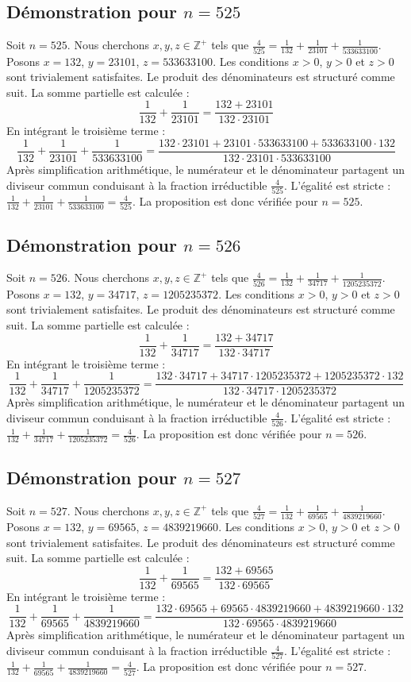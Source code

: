 \documentclass[11pt,a4paper]{article}
\begin{document}
\subsection{Démonstration pour $n = 525$}
Soit $n = 525$. Nous cherchons $x, y, z \in \mathbb{Z}^{+}$ tels que $\frac{4}{525} = \frac{1}{132} + \frac{1}{23101} + \frac{1}{533633100}$.
Posons $x = 132$, $y = 23101$, $z = 533633100$.
Les conditions $x > 0$, $y > 0$ et $z > 0$ sont trivialement satisfaites.
Le produit des dénominateurs est structuré comme suit. La somme partielle est calculée :
$$ \frac{1}{132} + \frac{1}{23101} = \frac{132+23101}{132 \cdot 23101} $$
En intégrant le troisième terme :
$$ \frac{1}{132} + \frac{1}{23101} + \frac{1}{533633100} = \frac{132 \cdot 23101 + 23101 \cdot 533633100 + 533633100 \cdot 132}{132 \cdot 23101 \cdot 533633100} $$
Après simplification arithmétique, le numérateur et le dénominateur partagent un diviseur commun conduisant à la fraction irréductible $\frac{4}{525}$.
L'égalité est stricte : $\frac{1}{132} + \frac{1}{23101} + \frac{1}{533633100} = \frac{4}{525}$.
La proposition est donc vérifiée pour $n = 525$.
\subsection{Démonstration pour $n = 526$}
Soit $n = 526$. Nous cherchons $x, y, z \in \mathbb{Z}^{+}$ tels que $\frac{4}{526} = \frac{1}{132} + \frac{1}{34717} + \frac{1}{1205235372}$.
Posons $x = 132$, $y = 34717$, $z = 1205235372$.
Les conditions $x > 0$, $y > 0$ et $z > 0$ sont trivialement satisfaites.
Le produit des dénominateurs est structuré comme suit. La somme partielle est calculée :
$$ \frac{1}{132} + \frac{1}{34717} = \frac{132+34717}{132 \cdot 34717} $$
En intégrant le troisième terme :
$$ \frac{1}{132} + \frac{1}{34717} + \frac{1}{1205235372} = \frac{132 \cdot 34717 + 34717 \cdot 1205235372 + 1205235372 \cdot 132}{132 \cdot 34717 \cdot 1205235372} $$
Après simplification arithmétique, le numérateur et le dénominateur partagent un diviseur commun conduisant à la fraction irréductible $\frac{4}{526}$.
L'égalité est stricte : $\frac{1}{132} + \frac{1}{34717} + \frac{1}{1205235372} = \frac{4}{526}$.
La proposition est donc vérifiée pour $n = 526$.
\subsection{Démonstration pour $n = 527$}
Soit $n = 527$. Nous cherchons $x, y, z \in \mathbb{Z}^{+}$ tels que $\frac{4}{527} = \frac{1}{132} + \frac{1}{69565} + \frac{1}{4839219660}$.
Posons $x = 132$, $y = 69565$, $z = 4839219660$.
Les conditions $x > 0$, $y > 0$ et $z > 0$ sont trivialement satisfaites.
Le produit des dénominateurs est structuré comme suit. La somme partielle est calculée :
$$ \frac{1}{132} + \frac{1}{69565} = \frac{132+69565}{132 \cdot 69565} $$
En intégrant le troisième terme :
$$ \frac{1}{132} + \frac{1}{69565} + \frac{1}{4839219660} = \frac{132 \cdot 69565 + 69565 \cdot 4839219660 + 4839219660 \cdot 132}{132 \cdot 69565 \cdot 4839219660} $$
Après simplification arithmétique, le numérateur et le dénominateur partagent un diviseur commun conduisant à la fraction irréductible $\frac{4}{527}$.
L'égalité est stricte : $\frac{1}{132} + \frac{1}{69565} + \frac{1}{4839219660} = \frac{4}{527}$.
La proposition est donc vérifiée pour $n = 527$.
\end{document}
